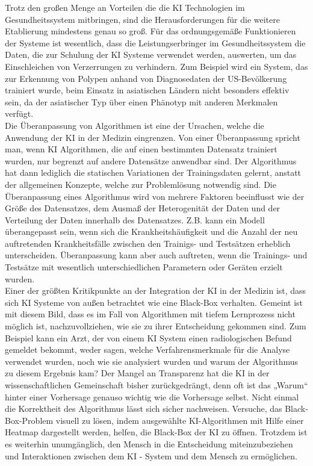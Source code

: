 Trotz den großen Menge an Vorteilen die die KI Technologien im Gesundheitssystem mitbringen, sind die Herausforderungen für die weitere Etablierung mindestens genau so groß. Für das ordnungsgemäße Funktionieren der Systeme ist wesentlich, dass die Leistungserbringer im Gesundheitssystem die Daten, die zur Schulung der KI Systeme verwendet werden, auswerten, um das Einschleichen von Verzerrungen zu verhindern.\cite{Chapter_14} Zum Beispiel wird ein System, das zur Erkennung von Polypen anhand von Diagnosedaten der US-Bevölkerung trainiert wurde, beim Einsatz in asiatischen Ländern nicht besonders effektiv sein, da der asiatischer Typ über einen Phänotyp mit anderen Merkmalen verfügt.\cite{Chapter_14}\\

Die Überanpassung von Algorithmen ist eine der Ursachen, welche die Anwendung der KI in der Medizin eingrenzen. Von einer Überanpassung spricht man, wenn KI Algorithmen, die auf einen bestimmten Datensatz trainiert wurden, nur begrenzt auf andere Datensätze anwendbar sind.\cite{AI_where_are_we_now} Der Algorithmus hat dann lediglich die statischen Variationen der Trainingsdaten gelernt, anstatt der allgemeinen Konzepte, welche zur Problemlösung notwendig sind. Die Überanpassung eines Algorithmus wird von mehrere Faktoren beeinflusst wie der Größe des Datensatzes, dem Ausmaß der Heterogenität der Daten und der Verteilung der Daten innerhalb des Datensatzes. Z.B. kann ein Modell überangepasst sein, wenn sich die Krankheitshäufigkeit und die Anzahl der neu auftretenden Krankheitsfälle zwischen den Trainigs- und Testsätzen erheblich unterscheiden.\cite{AI_where_are_we_now} Überanpassung kann aber auch auftreten, wenn die Trainings- und Testsätze mit wesentlich unterschiedlichen Parametern oder Geräten erzielt wurden.\cite{AI_where_are_we_now}\\

Einer der größten Kritikpunkte an der Integration der KI in der Medizin ist, dass sich KI Systeme von außen betrachtet wie eine Black-Box verhalten.\cite{The_missing_pieces} Gemeint ist mit diesem Bild, dass es im Fall von Algorithmen mit tiefem Lernprozess nicht möglich ist, nachzuvollziehen, wie sie zu ihrer Entscheidung gekommen sind.\cite{The_missing_pieces} Zum Beispiel kann ein Arzt, der von einem KI System einen radiologischen Befund gemeldet bekommt, weder sagen, welche Verfahrensmerkmale für die Analyse verwendet wurden, noch wie sie analysiert wurden und warum der Algorithmus zu diesem Ergebnis kam?\cite{The_missing_pieces} Der Mangel an Transparenz hat die KI in der wissenschaftlichen Gemeinschaft bisher zurückgedrängt, denn oft ist das „Warum“ hinter einer Vorhersage genauso wichtig wie die Vorhersage selbst. \cite{The_missing_pieces}
Nicht einmal die Korrektheit des Algorithmus lässt sich sicher nachweisen. Versuche, das Black-Box-Problem visuell zu lösen, indem ausgewählte KI-Algorithmen mit Hilfe einer Heatmap dargestellt werden, helfen, die Black-Box der KI zu öffnen.\cite{AI_where_are_we_now} Trotzdem ist es weiterhin unumgänglich, den Mensch in die Entscheidung miteinzubeziehen und Interaktionen zwischen dem KI - System und dem Mensch zu ermöglichen.\cite{AI_where_are_we_now}
\\

